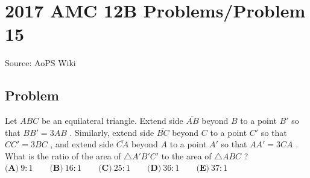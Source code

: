 \documentclass[12pt]{article}
\begin{document}
\section*{{2017 AMC 12B Problems/Problem 15}}
Source: AoPS Wiki

\subsection*{Problem}
Let $ABC$ be an equilateral triangle. Extend side $\overline{AB}$ beyond $B$ to a point $B'$ so that $BB'=3AB$ . Similarly, extend side $\overline{BC}$ beyond $C$ to a point $C'$ so that $CC'=3BC$ , and extend side $\overline{CA}$ beyond $A$ to a point $A'$ so that $AA'=3CA$ . What is the ratio of the area of $\triangle A'B'C'$ to the area of $\triangle ABC$ ? $\textbf{(A)}\ 9:1 \qquad\textbf{(B)}\ 16:1 \qquad\textbf{(C)}\ 25:1 \qquad\textbf{(D)}\ 36:1 \qquad\textbf{(E)}\ 37:1$
\end{document}
